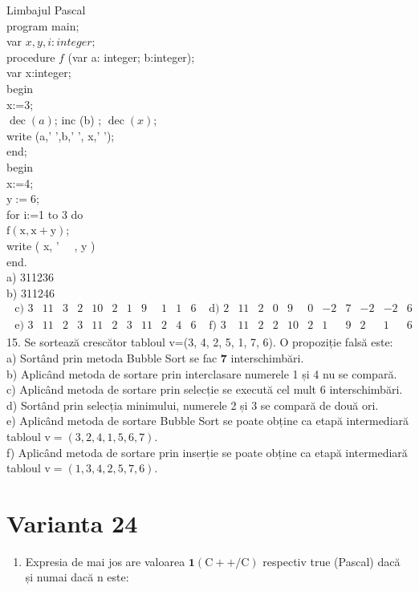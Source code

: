 Limbajul Pascal\\
program main;\\
var $x, y, i: i n t e g e r ;$\\
procedure $f$ (var a: integer; b:integer);\\
var x:integer;\\
begin\\
x:=3;\\
$\operatorname{dec}(a)$; inc (b) ; $\operatorname{dec}(x)$;\\
write (a,' ',b,' ', x,' ');\\
end;\\
begin\\
x:=4;\\
$\mathrm{y}:=6$;\\
for i:=1 to 3 do\\
$\mathrm{f}(\mathrm{x}, \mathrm{x}+\mathrm{y})$;\\
write ( x, ' $\quad$, y )\\
end.\\
a) 311236\\
b) 311246\\
$\begin{array}{llllllllllllllllllllll}\text { c) } 3 & 11 & 3 & 2 & 10 & 2 & 1 & 9 & 1 & 1 & 6 & \text { d) } 2 & 11 & 2 & 0 & 9 & 0 & -2 & 7 & -2 & -2 & 6 \\ \text { e) } 3 & 11 & 2 & 3 & 11 & 2 & 3 & 11 & 2 & 4 & 6 & \text { f) } 3 & 11 & 2 & 2 & 10 & 2 & 1 & 9 & 2 & 1 & 6\end{array}$\\
15. Se sortează crescător tabloul v=(3, 4, 2, 5, 1, 7, 6). O propoziție falsă este:\\
a) Sortând prin metoda Bubble Sort se fac $\mathbf{7}$ interschimbări.\\
b) Aplicând metoda de sortare prin interclasare numerele 1 și 4 nu se compară.\\
c) Aplicând metoda de sortare prin selecție se execută cel mult 6 interschimbări.\\
d) Sortând prin selecția minimului, numerele 2 și 3 se compară de două ori.\\
e) Aplicând metoda de sortare Bubble Sort se poate obține ca etapă intermediară tabloul $\mathrm{v}=(3,2,4,1,5,6,7)$.\\
f) Aplicând metoda de sortare prin inserție se poate obține ca etapă intermediară tabloul $\mathrm{v}=(1,3,4,2,5,7,6)$.

\section*{Varianta 24}
\begin{enumerate}
  \item Expresia de mai jos are valoarea $\mathbf{1}(\mathrm{C}++/ \mathrm{C})$ respectiv true (Pascal) dacă și numai dacă n este:
\end{enumerate}

